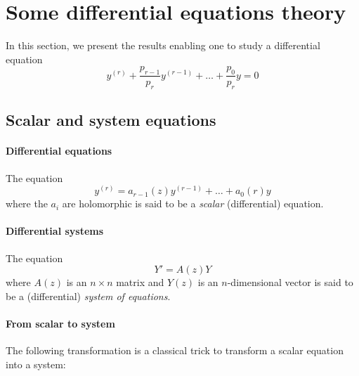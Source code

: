 \documentclass[../main.tex]{subfiles}
\begin{document}
\section{Some differential equations theory}

In this section, we present the results enabling one to study a differential equation
\begin{equation}\label{eqn_central}
y^{(r)} + \frac{p_{r-1}}{p_r} y^{(r - 1)} + \dots + \frac{p_0}{p_r} y = 0
\end{equation}

\subsection*{Scalar and system equations}

\paragraph{Differential equations}

The equation
\begin{equation}\label{scalar_eq}
	y^{(r)} = a_{r - 1}(z) y^{(r - 1)} + \dots + a_0(r) y
\end{equation}
where the $a_i$ are holomorphic is said to be a \emph{scalar} (differential) equation.

\paragraph{Differential systems}

The equation
\begin{equation}\label{system_eq}
	Y' = A(z) Y
\end{equation}
where $A(z)$ is an $n \times n$ matrix and $Y(z)$ is an $n$-dimensional vector
is said to be a (differential) \emph{system of equations}.

\paragraph{From scalar to system}

The following transformation is a classical trick to transform a scalar equation into a system:
\end{document}
